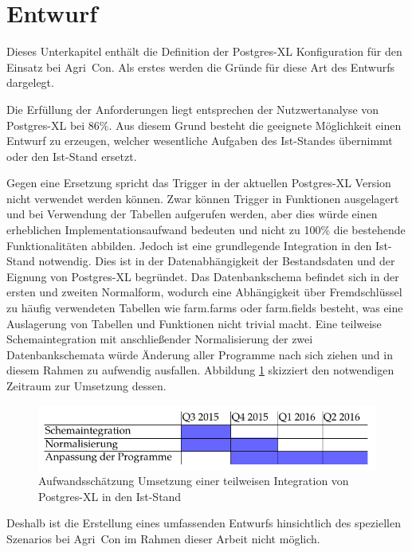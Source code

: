 \section{Entwurf}
Dieses Unterkapitel enthält die Definition der Postgres-XL Konfiguration für den Einsatz bei Agri~Con.
Als erstes werden die Gründe für diese Art des Entwurfs dargelegt.

Die Erfüllung der Anforderungen liegt entsprechen der Nutzwertanalyse von Postgres-XL bei 86\%{}.
Aus diesem Grund besteht die geeignete Möglichkeit einen Entwurf zu erzeugen, welcher wesentliche Aufgaben des Ist-Standes übernimmt oder den Ist-Stand ersetzt.

Gegen eine Ersetzung spricht das Trigger in der aktuellen Postgres-XL Version nicht verwendet werden können.
Zwar können Trigger in Funktionen ausgelagert und bei Verwendung der Tabellen aufgerufen werden, aber dies würde einen erheblichen Implementationsaufwand bedeuten und nicht zu 100\%{} die bestehende Funktionalitäten abbilden.
Jedoch ist eine grundlegende Integration in den Ist-Stand notwendig. %
Dies ist in der Datenabhängigkeit der Bestandsdaten und der Eignung von Postgres-XL begründet.
Das Datenbankschema befindet sich in der ersten und zweiten Normalform, wodurch eine Abhängigkeit über Fremdschlüssel zu häufig verwendeten Tabellen wie farm.farms oder farm.fields besteht, was eine Auslagerung von Tabellen und Funktionen nicht trivial macht.
Eine teilweise Schemaintegration mit anschließender Normalisierung der zwei Datenbankschemata würde Änderung aller Programme nach sich ziehen und in diesem Rahmen zu aufwendig ausfallen.
Abbildung \ref{fig:aufwand} skizziert den notwendigen Zeitraum zur Umsetzung dessen.
\begin{figure}[h!]
\centering
\includegraphics[width=.8\textwidth]{Abbildungen/gantt_aufwand_umsetzung_cropped.pdf}
\caption[Aufwandsschätzung Umsetzung einer teilweisen Integration von Postgres-XL]{Aufwandsschätzung Umsetzung einer teilweisen Integration von Postgres-XL in den Ist-Stand}
\label{fig:aufwand}
\end{figure}
Deshalb ist die Erstellung eines umfassenden Entwurfs hinsichtlich des speziellen Szenarios bei Agri~Con im Rahmen dieser Arbeit nicht möglich.

